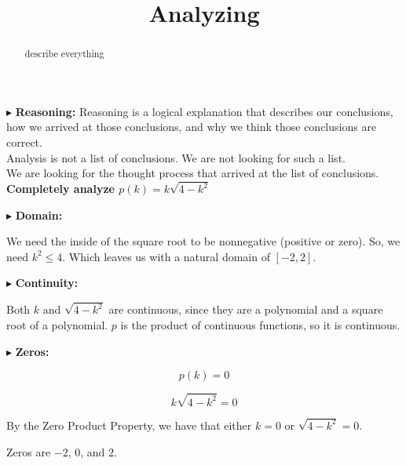 \documentclass{ximera}
\title{Analyzing}
\begin{document}
\begin{abstract}
describe everything
\end{abstract}
\maketitle




$\blacktriangleright$ \textbf{\textcolor{red!80!black}{Reasoning:}} Reasoning is a logical explanation that describes our conclusions, how we arrived at those conclusions, and why we think those conclusions are correct. \\

Analysis is not a list of conclusions. We are not looking for such a list. \\

We are looking for the thought process that arrived at the list of conclusions. \\







\textbf{\textcolor{purple!85!blue}{Completely analyze $p(k) = k \sqrt{4-k^2}$}}






$\blacktriangleright$  \textbf{\textcolor{blue!55!black}{Domain:}} 

We need the inside of the square root to be nonnegative (positive or zero).  So, we need $k^2 \leq 4$. Which leaves us with a natural domain of $[-2, 2]$.





$\blacktriangleright$  \textbf{\textcolor{blue!55!black}{Continuity:}} 

Both $k$ and $\sqrt{4 - k^2}$ are continuous, since they are a polynomial and a square root of a polynomial.  $p$ is the product of continuous functions, so it is continuous.



$\blacktriangleright$  \textbf{\textcolor{blue!55!black}{Zeros:}} 


\[  p(k) = 0   \]

\[  k \sqrt{4-k^2} = 0  \]


By the Zero Product Property, we have that either $k = 0$ or $\sqrt{4-k^2} = 0$.


Zeros are $-2$, $0$, and $2$. \\
\end{document}
